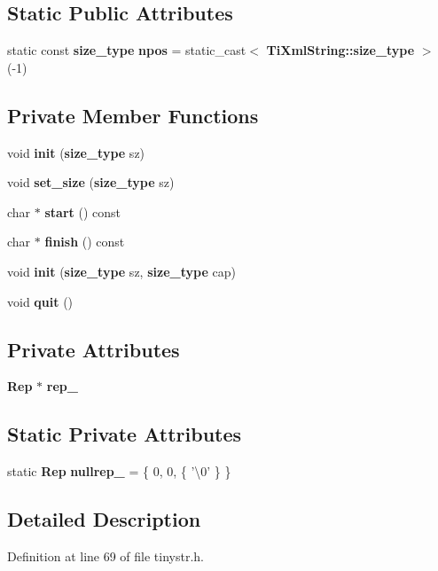 \subsection*{Static Public Attributes}
\begin{DoxyCompactItemize}
\item 
static const {\bf size\+\_\+type} {\bf npos} = static\+\_\+cast$<$ {\bf Ti\+Xml\+String\+::size\+\_\+type} $>$(-\/1)
\end{DoxyCompactItemize}
\subsection*{Private Member Functions}
\begin{DoxyCompactItemize}
\item 
void {\bf init} ({\bf size\+\_\+type} sz)
\item 
void {\bf set\+\_\+size} ({\bf size\+\_\+type} sz)
\item 
char $\ast$ {\bf start} () const 
\item 
char $\ast$ {\bf finish} () const 
\item 
void {\bf init} ({\bf size\+\_\+type} sz, {\bf size\+\_\+type} cap)
\item 
void {\bf quit} ()
\end{DoxyCompactItemize}
\subsection*{Private Attributes}
\begin{DoxyCompactItemize}
\item 
{\bf Rep} $\ast$ {\bf rep\+\_\+}
\end{DoxyCompactItemize}
\subsection*{Static Private Attributes}
\begin{DoxyCompactItemize}
\item 
static {\bf Rep} {\bf nullrep\+\_\+} = \{ 0, 0, \{ '\textbackslash{}0' \} \}
\end{DoxyCompactItemize}


\subsection{Detailed Description}


Definition at line 69 of file tinystr.\+h.



